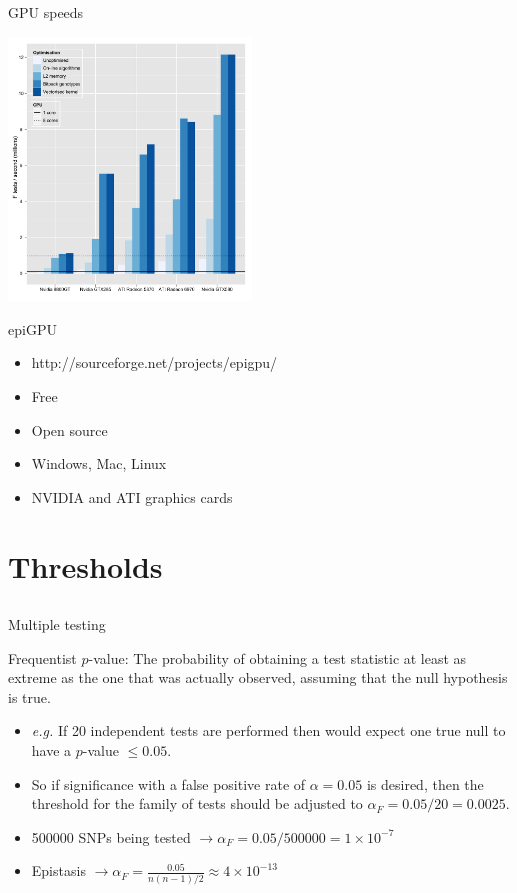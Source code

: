 \documentclass{beamer}
\begin{document}
\begin{frame}{GPU speeds}
\begin{center}
\includegraphics[height=7cm]{gpuoptimisation.pdf}
\end{center}
\end{frame}

\begin{frame}{epiGPU}
\begin{itemize}
\item http://sourceforge.net/projects/epigpu/
\item Free
\item Open source
\item Windows, Mac, Linux
\item NVIDIA and ATI graphics cards
\end{itemize}
\end{frame}



\section{Thresholds}
\subsection{}

\begin{frame}{Multiple testing}
\begin{definition}
{\color{orange} Frequentist $p$-value: The probability of obtaining a test statistic at least as extreme as the one that was actually observed, assuming that the null hypothesis is true.}
\end{definition}
\begin{itemize}
\item \emph{e.g.} If 20 independent tests are performed then would expect one true null to have a $p$-value $\leq 0.05$.
\item So if significance with a false positive rate of $\alpha = 0.05$ is desired, then the threshold for the family of tests should be adjusted to $\alpha_{F} = 0.05 / 20 = 0.0025$.
\item 500000 SNPs being tested $\rightarrow \alpha_{F} = 0.05 / 500000 = 1 \times 10^{-7}$
\item Epistasis $\rightarrow \alpha_{F} = \frac{0.05}{n(n-1)/2} \approx 4 \times 10^{-13}$
\end{itemize}
\end{frame}
\end{document}
